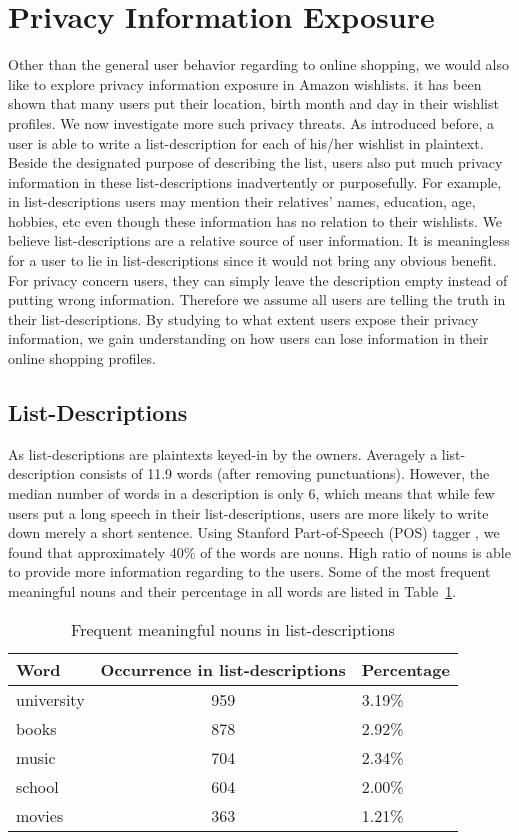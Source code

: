 \section{Privacy Information Exposure}
Other than the general user behavior regarding to online shopping, we would also like to explore privacy information exposure in Amazon wishlists. it has been shown that many users put their location, birth month and day in their wishlist profiles. We now investigate more such privacy threats. As introduced before, a user is able to write a list-description for each of his/her wishlist in plaintext. Beside the designated purpose of describing the list, users also put much privacy information in these list-descriptions inadvertently or purposefully. For example, in list-descriptions users may mention their relatives' names, education, age, hobbies, etc even though these information has no relation to their wishlists. We believe list-descriptions are a relative source of user information. It is meaningless for a user to lie in list-descriptions since it would not bring any obvious benefit. For privacy concern users, they can simply leave the description empty instead of putting wrong information. Therefore we assume all users are telling the truth in their list-descriptions. By studying to what extent users expose their privacy information, we gain understanding on how users can lose information in their online shopping profiles.

\subsection{List-Descriptions}
As list-descriptions are plaintexts keyed-in by the owners. Averagely a list-description consists of 11.9 words (after removing punctuations). However, the median number of words in a description is only 6, which means that while few users put a long speech in their list-descriptions, users are more likely to write down merely a short sentence. Using Stanford Part-of-Speech (POS) tagger \cite{toutanova2003feature}, we found that approximately 40\% of the words are nouns. High ratio of nouns is able to provide more information regarding to the users. Some of the most frequent meaningful nouns and their percentage in all words are listed in Table~\ref{tb:words}. 

\begin{table}[t]
\centering
\caption{Frequent meaningful nouns in list-descriptions}
\label{tb:words}
\begin{adjustbox}{max width=.5\textwidth}
\begin{tabular}{lcl}
Word & Occurrence in list-descriptions & Percentage \\ \hline
university & 959 & 3.19\%	\\
books & 878 & 2.92\%		\\
music & 704 & 2.34\%		\\
school & 604 & 2.00\%	\\
movies & 363 & 1.21\%	

\end{tabular}
\end{adjustbox}
\end{table}

